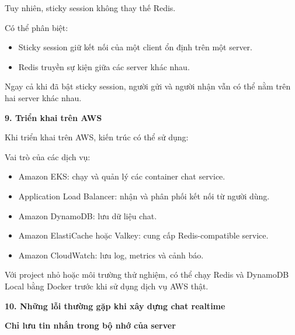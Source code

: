 Tuy nhiên, sticky session không thay thế Redis.

Có thể phân biệt:

\begin{itemize}
\tightlist
\item
  Sticky session giữ kết nối của một client ổn định trên một server.
\item
  Redis truyền sự kiện giữa các server khác nhau.
\end{itemize}

Ngay cả khi đã bật sticky session, người gửi và người nhận vẫn có thể
nằm trên hai server khác nhau.

\vspace{0.5em}\noindent\textbf{9. Triển khai trên AWS}\par

Khi triển khai trên AWS, kiến trúc có thể sử dụng:

\begin{Shaded}
\begin{Highlighting}[]
\end{Highlighting}
\end{Shaded}

Vai trò của các dịch vụ:

\begin{itemize}
\tightlist
\item
  Amazon EKS: chạy và quản lý các container chat service.
\item
  Application Load Balancer: nhận và phân phối kết nối từ người dùng.
\item
  Amazon DynamoDB: lưu dữ liệu chat.
\item
  Amazon ElastiCache hoặc Valkey: cung cấp Redis-compatible service.
\item
  Amazon CloudWatch: lưu log, metrics và cảnh báo.
\end{itemize}

Với project nhỏ hoặc môi trường thử nghiệm, có thể chạy Redis và
DynamoDB Local bằng Docker trước khi sử dụng dịch vụ AWS thật.

\vspace{0.5em}\noindent\textbf{10. Những lỗi thường gặp khi xây dựng chat
realtime}\par

\vspace{0.5em}\noindent\textbf{Chỉ lưu tin nhắn trong bộ nhớ của
server}\par


